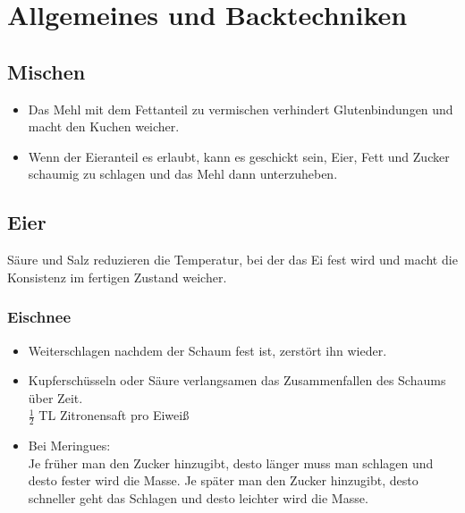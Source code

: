 \chapter{Allgemeines und Backtechniken}
\section{Mischen}
\begin{itemize}
	\item Das Mehl mit dem Fettanteil zu vermischen verhindert Glutenbindungen und macht den Kuchen weicher.
	\item Wenn der Eieranteil es erlaubt, kann es geschickt sein, Eier, Fett und Zucker schaumig zu schlagen und das Mehl dann unterzuheben.
\end{itemize}

\section{Eier}
Säure und Salz reduzieren die Temperatur, bei der das Ei fest wird und macht die Konsistenz im fertigen Zustand weicher.
\subsection{Eischnee}
\begin{itemize}
	\item Weiterschlagen nachdem der Schaum fest ist, zerstört ihn wieder.
	\item Kupferschüsseln oder Säure verlangsamen das Zusammenfallen des Schaums über Zeit.\\
		$\frac{1}{2}$ TL Zitronensaft pro Eiweiß
	\item Bei Meringues:\\
		Je früher man den Zucker hinzugibt, desto länger muss man schlagen und desto fester wird die Masse.
		Je später man den Zucker hinzugibt, desto schneller geht das Schlagen und desto leichter wird die Masse.
\end{itemize}

